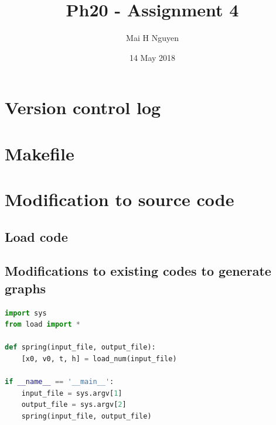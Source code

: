\documentclass[10pt]{article}
\begin{document}
 
\title{Ph20 - Assignment 4}
\author{Mai H Nguyen}
\date{14 May 2018}
 
\maketitle
\section{Version control log}


\section {Makefile}


\section{Modification to source code}
\subsection{Load code}


\subsection{Modifications to existing codes to generate graphs}
\begin{lstlisting}[language=Python]
import sys
from load import *

def spring(input_file, output_file):
    [x0, v0, t, h] = load_num(input_file)

if __name__ == '__main__':
    input_file = sys.argv[1]
    output_file = sys.argv[2]
    spring(input_file, output_file)
\end{lstlisting}
\end{document}
